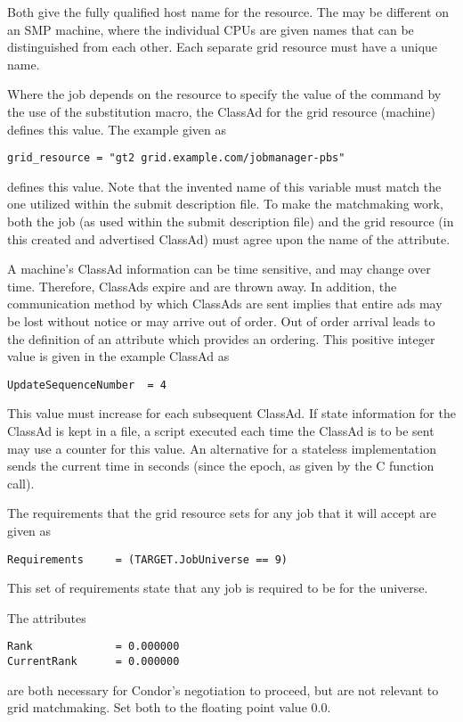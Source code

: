 Both give the fully qualified host name for the resource.
The  may be different on an SMP machine,
where the individual CPUs are given names that can
be distinguished from each other.
Each separate grid resource must have a unique name.

Where the job depends on the resource to specify the
value of the  command by
the use of the substitution macro,
the ClassAd for the grid resource (machine)
defines this value.
The example given as
\footnotesize
\begin{verbatim}
grid_resource = "gt2 grid.example.com/jobmanager-pbs"
\end{verbatim}
\normalsize
defines this value.
Note that the invented name of this variable must match the
one utilized within the submit description file.
To make the matchmaking work,
both the job (as used within the submit description file)
and the grid resource (in this created and advertised ClassAd)
must agree upon the name of the attribute.

A machine's ClassAd information can be time sensitive,
and may change over time.
Therefore, ClassAds expire and are thrown away.
In addition, the communication method by which ClassAds
are sent implies that entire ads may be lost without notice
or may arrive out of order.
Out of order arrival leads to the definition of an
attribute which provides an ordering.
This positive integer value is given in the example
ClassAd as
\footnotesize
\begin{verbatim}
UpdateSequenceNumber  = 4
\end{verbatim}
\normalsize
This value must increase for each subsequent ClassAd.
If state information for the ClassAd is kept in a file,
a script executed each time the ClassAd is to be sent
may use a counter for this value.
An alternative for a stateless implementation sends
the current time in seconds (since the epoch, as given by
the C  function call).

The requirements that the grid resource sets for any job
that it will accept are given as
\footnotesize
\begin{verbatim}
Requirements     = (TARGET.JobUniverse == 9)
\end{verbatim}
\normalsize
This set of requirements state that any job is
required to be for the  universe.

The attributes
\footnotesize
\begin{verbatim}
Rank             = 0.000000
CurrentRank      = 0.000000
\end{verbatim}
\normalsize
are both necessary for Condor's negotiation to proceed,
but are not relevant to grid matchmaking.
Set both to the floating point value 0.0.


